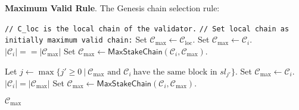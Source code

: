 \bigbreak
\bigbreak
\noindent
{}
\textbf{Maximum Valid Rule}.\label{apndx:max-valid-rule}
The Genesis chain selection rule:
\begin{algo}
    \caption{${\textsf{MaxValidChain}(\mathcal{C}_{\text{loc}}, C_{\text{set}} = \{\mathcal{C}_i\}_{i=1}^N, K_{\text{f}}, K_{\text{g}})}$}
    \begin{algorithmic}[1]
        \noindent
        \lstinline|// C_loc is the local chain of the validator.|
        \noindent
        \lstinline|// Set local chain as initially maximum valid chain:|
        \State Set ${\mathcal{C}_{\max} \leftarrow \mathcal{C}_{\text{loc}}}$.
                    \State Set ${\mathcal{C}_{\max} \leftarrow \mathcal{C}_{i}}$.
                \ElsIf
                        {$|\mathcal{C}_i| == |\mathcal{C}_{\max}|$}
                    \State Set ${\mathcal{C}_{\max} \leftarrow \textsf{MaxStakeChain}(\mathcal{C}_{i}, \mathcal{C}_{\max})}$.

                \EndIf
            \Else

                \State Let ${j  \leftarrow \max \{j' \geq 0 \ |\  \mathcal{C}_{\max} \text{ and } \mathcal{C}_{i} \
                \text{have the same block in } sl_{j'}\}}$.
                    \State Set ${\mathcal{C}_{\max} \leftarrow \mathcal{C}_{i}}$.
                \ElsIf
                        {$|\mathcal{C}_i| = |\mathcal{C}_{\max}|$}
                    \State Set ${\mathcal{C}_{\max} \leftarrow \textsf{MaxStakeChain}(\mathcal{C}_{i}, \mathcal{C}_{\max})}$.
                \EndIf
            \EndIf

        \EndFor
        \State \Return ${\mathcal{C}_{\max}}$
    \end{algorithmic}\label{alg:max-valid-rule}
\end{algo}

